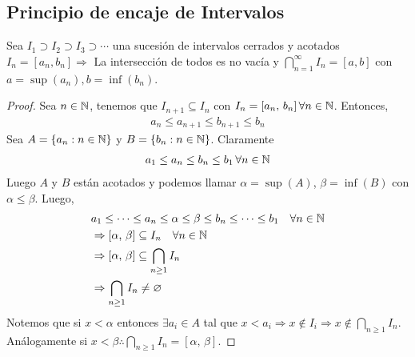 \subsection{Principio de encaje de Intervalos}

\begin{theorem}
	Sea \(I_1 \supset I_2 \supset I_3 \supset \cdots \) una sucesión de intervalos cerrados y acotados \(I_n = [a_n, b_n] \Rightarrow \)
	La intersección de todos es no vacía y \(\bigcap_{n=1}^{\infty} I_n = [a,b]\) con \(a = \sup(a_n), b=\inf(b_n)\).
	\begin{proof}
		Sea \(n \in \mathbb{N} \), tenemos que \(I_{n+1} \subseteq I_n\) con \(I_n = [a_n\text{, } b_n] \, \forall n \in \mathbb{N} \). Entonces, \begin{align*}
			a_n \leq a_{n+1} \leq b_{n+1} \leq b_n
		\end{align*}
		Sea \(A = \{ a_n : n \in \mathbb{N} \} \) y \(B = \{ b_n : n \in \mathbb{N} \} \). Claramente \begin{align*}
			a_1 \leq a_n \leq b_n \leq b_1 \, \forall n \in \mathbb{N}
		\end{align*}
		Luego \(A\) y \(B\) están acotados y podemos llamar \(\alpha = \sup(A)\), \(\beta = \inf(B)\) con \(\alpha \leq \beta \). Luego, \begin{align*}
			 & a_1 \leq \cdots \leq a_n \leq \alpha \leq \beta \leq b_n \leq \cdots \leq b_1 \quad \forall n \in \mathbb{N} \\
			 & \Rightarrow [\alpha\text{, }\beta] \subseteq I_n \quad \forall n \in \mathbb{N}                              \\
			 & \Rightarrow [\alpha\text{, }\beta] \subseteq \bigcap_{n \geq 1} I_n                                  \\
			 & \Rightarrow \bigcap_{n \geq 1} I_n \neq \varnothing
		\end{align*}
		Notemos que si \(x < \alpha \) entonces \(\exists a_i \in A\) tal que \(x < a_i \Rightarrow x \notin I_i \Rightarrow x \notin \bigcap_{n \geq 1} I_n\).
		Análogamente si \(x < \beta \therefore \bigcap_{n \geq 1} I_n = [\alpha\text{, }\beta]\).
	\end{proof}
\end{theorem}

